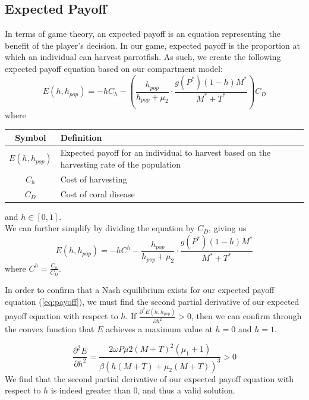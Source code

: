 \documentclass[12pt]{article}
\begin{document}
\subsection{Expected Payoff}
In terms of game theory, an expected payoff is an equation representing the benefit of the player's decision. In our game, expected payoff is the proportion at which an individual can harvest parrotfish. As such, we create the following expected payoff equation based on our compartment model:
\begin{equation}\label{eq:initial_payoff}
    \displaystyle {E(h, h_{pop}) = -hC_{h} - \left( \frac{h_{pop}}{h_{pop} + \mu_{2}} \cdot \frac{g(P^{*})(1-h)M^{*}}{M^{*} + T^{*}} \right) C_{D}}
\end{equation}
where
\begin{table}[H]
    \centering
    \begin{tabular}{c|p{9cm}}
         Symbol & Definition \\
         \hline
         $E(h, h_{pop})$ & Expected payoff for an individual to harvest based on the harvesting rate of the population \\
         $C_{h}$ & Cost of harvesting \\
         $C_{D}$ & Cost of coral disease \\
    \end{tabular}
    \label{tab:payoff_eq_params}
\end{table}
and $h \in [0,1]$. \\
We can further simplify by dividing the equation by $C_{D}$, giving us 
\begin{equation}\label{eq:payoff}
    \displaystyle {E(h, h_{pop}) = -hC^{h} - \frac{h_{pop}}{h_{pop} + \mu_{2}} \cdot \frac{g(P^{*})(1-h)M^{*}}{M^{*} + T^{*}}}
\end{equation}
where $C^{h} = \frac{C_{h}}{C_{D}}$. \\ \par
In order to confirm that a Nash equilibrium exists for our expected payoff equation (\ref{eq:payoff}), we must find the second partial derivative of our expected payoff equation with respect to $h$. If $\frac{\partial^{2}E(h, h_{pop})}{\partial h^{2}} > 0$, then we can confirm through the convex function that $E$ achieves a maximum value at $h=0$ and $h=1$. \par
\begin{equation}\label{eq:nash_partial_deriv}
    \displaystyle {\frac{\partial ^ {2} E}{\partial h^{2}} = \frac{2 \omega P \mu{2} (M+T)^{2} (\mu_{1} +1)}{\beta(h(M+T) + \mu_{2}(M+T))^{3}} > 0}
\end{equation}
We find that the second partial derivative of our expected payoff equation with respect to $h$ is indeed greater than 0, and thus a valid solution.
\end{document}
